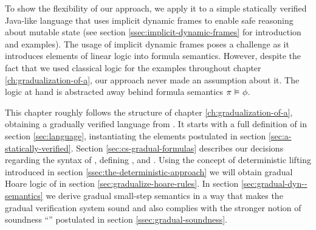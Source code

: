 To show the flexibility of our approach, we apply it to a simple statically verified Java-like language \svlidf that uses implicit dynamic frames to enable safe reasoning about mutable state (see section \ref{ssec:implicit-dynamic-frames} for introduction and examples).
The usage of implicit dynamic frames poses a challenge as it introduces elements of linear logic into formula semantics.
However, despite the fact that we used classical logic for the examples throughout chapter \ref{ch:gradualization-of-a}, our approach never made an assumption about it.
The logic at hand is abstracted away behind formula semantics $\pi \,\,{\vDash}\,\, \phi$.

This chapter roughly follows the structure of chapter \ref{ch:gradualization-of-a}, obtaining a gradually verified language \gvlidf from \svlidf.
It starts with a full definition of \svlidf in section \ref{sec:language}, instantiating the elements postulated in section \ref{sec:a-statically-verified}.
Section \ref{sec:cs-gradual-formulas} describes our decisions regarding the syntax of \gvlidf, defining \setGFormula, \setGStmt and \setGProgramState.
Using the concept of deterministic lifting introduced in section \ref{ssec:the-deterministic-approach} we will obtain gradual Hoare logic of \gvlidf in section \ref{sec:gradualize-hoare-rules}.
In section \ref{sec:gradual-dyn--semantics} we derive gradual small-step semantics in a way that makes the gradual verification system sound and also complies with the stronger notion of soundness “” postulated in section \ref{ssec:gradual-soundness}.